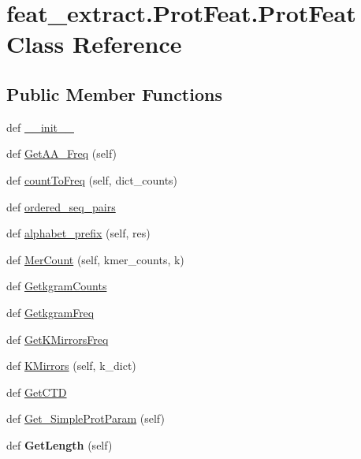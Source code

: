\hypertarget{classfeat__extract_1_1_prot_feat_1_1_prot_feat}{}\section{feat\+\_\+extract.\+Prot\+Feat.\+Prot\+Feat Class Reference}
\label{classfeat__extract_1_1_prot_feat_1_1_prot_feat}
\subsection*{Public Member Functions}
\begin{DoxyCompactItemize}
\item 
def \hyperlink{classfeat__extract_1_1_prot_feat_1_1_prot_feat_a3735b241e73d91edf45a4f1edd722ea7}{\+\_\+\+\_\+init\+\_\+\+\_\+}
\item 
def \hyperlink{classfeat__extract_1_1_prot_feat_1_1_prot_feat_a2ccaa9437f70532d45069e4eb94c3c21}{Get\+A\+A\+\_\+\+Freq} (self)
\item 
def \hyperlink{classfeat__extract_1_1_prot_feat_1_1_prot_feat_a603ae748d2527d00821a9a1f63f007d9}{count\+To\+Freq} (self, dict\+\_\+counts)
\item 
def \hyperlink{classfeat__extract_1_1_prot_feat_1_1_prot_feat_a7a9fe63c2f412f7644cc0a814cc5be37}{ordered\+\_\+seq\+\_\+pairs}
\item 
def \hyperlink{classfeat__extract_1_1_prot_feat_1_1_prot_feat_a437f8c4ea839093b5e33f4c13e894a09}{alphabet\+\_\+prefix} (self, res)
\item 
def \hyperlink{classfeat__extract_1_1_prot_feat_1_1_prot_feat_a158fb3fdf8ae66e27116ca58e25752bf}{Mer\+Count} (self, kmer\+\_\+counts, k)
\item 
def \hyperlink{classfeat__extract_1_1_prot_feat_1_1_prot_feat_a0f80df6810f710824dbaab6e30ae3775}{Getkgram\+Counts}
\item 
def \hyperlink{classfeat__extract_1_1_prot_feat_1_1_prot_feat_a8ce3fc3e99eea09835b08d8af39e67c5}{Getkgram\+Freq}
\item 
def \hyperlink{classfeat__extract_1_1_prot_feat_1_1_prot_feat_a8b59569502aef30304207fe0303b28c7}{Get\+K\+Mirrors\+Freq}
\item 
def \hyperlink{classfeat__extract_1_1_prot_feat_1_1_prot_feat_a76dc57875b17b82b065e4958eb6ec8ed}{K\+Mirrors} (self, k\+\_\+dict)
\item 
def \hyperlink{classfeat__extract_1_1_prot_feat_1_1_prot_feat_a5e9846e49d823597d17b7ce15d959a09}{Get\+C\+T\+D}
\item 
def \hyperlink{classfeat__extract_1_1_prot_feat_1_1_prot_feat_ad804cf2dea87e471c03a409a0391b819}{Get\+\_\+\+Simple\+Prot\+Param} (self)
\item 
\hypertarget{classfeat__extract_1_1_prot_feat_1_1_prot_feat_a1f46aa7f046055c9ab534234e4ad244e}{}def {\bfseries Get\+Length} (self)\label{classfeat__extract_1_1_prot_feat_1_1_prot_feat_a1f46aa7f046055c9ab534234e4ad244e}


\end{DoxyCompactItemize}
